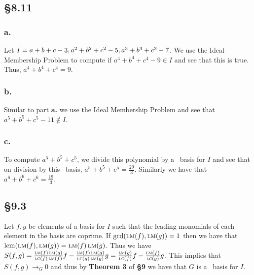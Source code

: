 \documentclass[letterpaper]{article}
\begin{document}
\subsection*{\S 8.11}

\subsubsection*{a.}

Let $I = \gen{a + b + c - 3, a^{2} + b^{2} + c^{2} - 5, a^{3} + b^{3} + c^{3} - 7}$.
We use the Ideal Membership Problem to compute if $a^{4} + b^{4} + c^{4} - 9 \in I$ and see that this is true.
Thus, $a^{4} + b^{4} + c^{4} = 9$.

\subsubsection*{b.}

Similar to part \textbf{a.} we use the Ideal Membership Problem and see that $a^{5} + b^{5} + c^{5} - 11 \notin I$.

\subsubsection*{c.}

To compute $a^{5} + b^{5} + c^{5}$, we divide this polynomial by a \Grobner\ basis for $I$ and see that on division by this \Grobner\ basis, $a^{5} + b^{5} + c^{5} = \frac{29}{3}$.
Similarly we have that $a^{6} + b^{6} + c^{6} = \frac{19}{3}$.

\subsection*{\S 9.3}

Let $f, g$ be elements of a basis for $I$ such that the leading monomials of each element in the basis are coprime.
If $\gcd(\operatorname{\textsc{lm}}(f), \operatorname{\textsc{lm}}(g)) = 1$ then we have that $\operatorname{lcm}(\operatorname{\textsc{lm}}(f), \operatorname{\textsc{lm}}(g)) = \operatorname{\textsc{lm}}(f) \operatorname{\textsc{lm}}(g)$.
Thus we have $S(f, g) = \frac{\operatorname{\textsc{lm}}(f) \operatorname{\textsc{lm}}(g)}{\operatorname{\textsc{lc}}(f)\operatorname{\textsc{lm}}(f)} f - \frac{\operatorname{\textsc{lm}}(f) \operatorname{\textsc{lm}}(g)}{\operatorname{\textsc{lc}}(g)\operatorname{\textsc{lm}}(g)} g = \frac{\operatorname{\textsc{lm}}(g)}{\operatorname{\textsc{lc}}(f)} f - \frac{\operatorname{\textsc{lm}}(f)}{\operatorname{\textsc{lc}}(g)} g$.
This implies that $S(f, g) \to_{G} 0$ and thus by \textbf{Theorem 3} of \textbf{\S 9} we have that $G$ is a \Grobner\ basis for $I$.

\printbibliography
\end{document}
